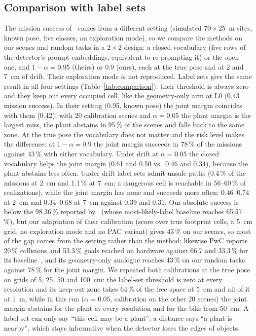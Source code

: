 \documentclass[conference]{IEEEtran}
\theoremstyle{definition}
\begin{document}
\subsection{Comparison with label sets}

\begin{table}[t]
\centering
\caption{Random tasks (420 in 21 scenes): mission success. $^\ast$ some paths are unsafe.}
\label{tab:comparison}
\setlength{\tabcolsep}{3pt}
\footnotesize

\end{table}

The mission success of~\cite{sundarsingh} comes from a different setting (simulated $70\times25$~m sites, known pose, five
classes, an exploration mode), so we compare the methods on our scenes and random tasks in a $2 \times 2$ design: a closed
vocabulary (five rows of the detector's prompt embeddings, equivalent to re-prompting it) or the open one, and
$1 - \alpha = 0.95$ (theirs) or $0.9$ (ours), each at the true pose and at 2 and 7~cm of drift. Their exploration mode is
not reproduced. Label sets give the same result in all four settings (Table~\ref{tab:comparison}): their threshold is
always zero and they keep out every occupied cell, like the geometry-only arm at L0 (0.43 mission success). In their
setting (0.95, known pose) the joint margin coincides with them (0.42): with 20 calibration scenes and $\alpha = 0.05$
the plant margin is the largest miss, the plant abstains in 95\,\% of the scenes and falls back to the same zone. At the
true pose the vocabulary does not matter and the risk level makes the difference: at $1 - \alpha = 0.9$ the joint
margin succeeds in 78\,\% of the missions against 43\,\% with either vocabulary. Under drift at $\alpha = 0.05$ the
closed vocabulary helps the joint margin (0.61 and 0.50 vs.\ 0.46 and 0.34), because the plant abstains less often. Under drift label sets admit unsafe paths (0.4\,\% of the
missions at 2~cm and 1.1\,\% at 7~cm; a dangerous cell is reachable in 56--60\,\% of realizations), while the joint
margin has none and succeeds more often: 0.46--0.74 at 2~cm and 0.34--0.68 at 7~cm against 0.39 and 0.31. Our absolute success is below the 98.36\,\% reported by~\cite{sundarsingh} (whose most-likely-label baseline
reaches 65.57\,\%), but our adaptation of their calibration (score over true footprint cells, a 5~cm grid, no exploration mode and no
PAC variant) gives 43\,\% on our scenes, so most of the gap comes from the setting rather than the method; likewise PwC reports 20\,\% collisions and 53.3\,\% goals reached on
hardware against 66.7 and 33.3\,\% for its baseline~\cite{pwc}, and its geometry-only analogue reaches 43\,\% on our
random tasks against 78\,\% for the joint margin. We repeated
both calibrations at the true pose on grids of 5, 25, 50 and 100~cm: the label-set threshold is zero at every resolution
and its keep-out zone takes 64\,\% of the free space at 5~cm and all of it at 1~m, while in this run ($\alpha = 0.05$, calibration on
the other 20 scenes) the joint margin abstains for the plant at every resolution and for the bike from 50~cm. A label set can only say ``this cell may be a plant''; a distance says ``a
plant is nearby'', which stays informative when the detector loses the edges of objects.
\end{document}
